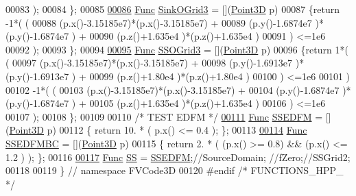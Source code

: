 \begin{DoxyCode}
00083                );
00084     \};
00085 
\hypertarget{functions_8hpp_source.tex_l00086}{}\hyperlink{namespaceFVCode3D_a1d325cbbfbdf5832333e0a07e6095053}{00086} \hyperlink{namespaceFVCode3D_a38fa3b2520ad364d2c3d56ea5077826a}{Func} \hyperlink{namespaceFVCode3D_a1d325cbbfbdf5832333e0a07e6095053}{SinkOGrid3} = [](\hyperlink{classFVCode3D_1_1Point3D}{Point3D} p)
00087     \{\textcolor{keywordflow}{return} -1*( (
00088                      (p.x()-3.15185e7)*(p.x()-3.15185e7) +
00089                      (p.y()-1.6874e7 )*(p.y()-1.6874e7 ) +
00090                      (p.z()+1.635e4  )*(p.z()+1.635e4  )
00091                   ) <=1e6
00092                 );
00093     \};
00094 
\hypertarget{functions_8hpp_source.tex_l00095}{}\hyperlink{namespaceFVCode3D_ad684cb0cef80af1bba8db353619ab1cf}{00095} \hyperlink{namespaceFVCode3D_a38fa3b2520ad364d2c3d56ea5077826a}{Func} \hyperlink{namespaceFVCode3D_ad684cb0cef80af1bba8db353619ab1cf}{SSOGrid3} = [](\hyperlink{classFVCode3D_1_1Point3D}{Point3D} p)
00096     \{\textcolor{keywordflow}{return} 1*( (
00097                     (p.x()-3.15185e7)*(p.x()-3.15185e7) +
00098                     (p.y()-1.6913e7 )*(p.y()-1.6913e7 ) +
00099                     (p.z()+1.80e4   )*(p.z()+1.80e4   )
00100                  ) <=1e6
00101                )
00102             -1*( (
00103                     (p.x()-3.15185e7)*(p.x()-3.15185e7) +
00104                     (p.y()-1.6874e7 )*(p.y()-1.6874e7 ) +
00105                     (p.z()+1.635e4  )*(p.z()+1.635e4  )
00106                  ) <=1e6
00107                );
00108     \};
00109 
00110 \textcolor{comment}{/* TEST EDFM */}
\hypertarget{functions_8hpp_source.tex_l00111}{}\hyperlink{namespaceFVCode3D_a57e80824f085310d70ceed215314b9eb}{00111} \hyperlink{namespaceFVCode3D_a38fa3b2520ad364d2c3d56ea5077826a}{Func} \hyperlink{namespaceFVCode3D_a57e80824f085310d70ceed215314b9eb}{SSEDFM} = [](\hyperlink{classFVCode3D_1_1Point3D}{Point3D} p)
00112     \{ \textcolor{keywordflow}{return} 10. * ( p.x() <= 0.4 ); \};
00113     
\hypertarget{functions_8hpp_source.tex_l00114}{}\hyperlink{namespaceFVCode3D_a84fa11f60a0d07f58d20dcd63837a333}{00114} \hyperlink{namespaceFVCode3D_a38fa3b2520ad364d2c3d56ea5077826a}{Func} \hyperlink{namespaceFVCode3D_a84fa11f60a0d07f58d20dcd63837a333}{SSEDFMBC} = [](\hyperlink{classFVCode3D_1_1Point3D}{Point3D} p)
00115     \{ \textcolor{keywordflow}{return} 2. * ( (p.x() >= 0.8) && (p.x() <= 1.2 ) ); \};
00116 
\hypertarget{functions_8hpp_source.tex_l00117}{}\hyperlink{namespaceFVCode3D_ae8b0f97f0774db9f0881cfc5f31d93f4}{00117} \hyperlink{namespaceFVCode3D_a38fa3b2520ad364d2c3d56ea5077826a}{Func} \hyperlink{namespaceFVCode3D_ae8b0f97f0774db9f0881cfc5f31d93f4}{SS} = \hyperlink{namespaceFVCode3D_a57e80824f085310d70ceed215314b9eb}{SSEDFM};\textcolor{comment}{//SourceDomain; //fZero;//SSGrid2;}
00118 
00119 \} \textcolor{comment}{// namespace FVCode3D}
00120 \textcolor{preprocessor}{#endif }\textcolor{comment}{/* FUNCTIONS\_HPP\_ */}\textcolor{preprocessor}{}
\end{DoxyCode}

